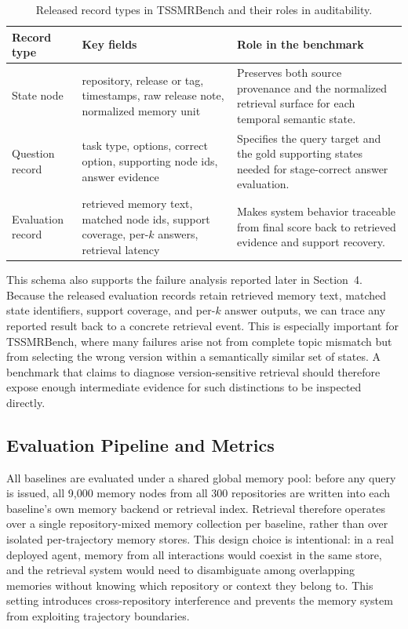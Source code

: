 \begin{table}[t]
\centering
\scriptsize
\caption{Released record types in TSSMRBench and their roles in auditability.}
\label{tab:record-schema}
\setlength{\tabcolsep}{2.5pt}
\begin{tabular}{p{}p{}p{}}
\toprule
Record type & Key fields & Role in the benchmark \\
\midrule
State node & repository, release or tag, timestamps, raw release note, normalized memory unit & Preserves both source provenance and the normalized retrieval surface for each temporal semantic state. \\
Question record & task type, options, correct option, supporting node ids, answer evidence & Specifies the query target and the gold supporting states needed for stage-correct answer evaluation. \\
Evaluation record & retrieved memory text, matched node ids, support coverage, per-$k$ answers, retrieval latency & Makes system behavior traceable from final score back to retrieved evidence and support recovery. \\
\bottomrule
\end{tabular}
\end{table}

This schema also supports the failure analysis reported later in Section~4. Because the released evaluation records retain retrieved memory text, matched state identifiers, support coverage, and per-$k$ answer outputs, we can trace any reported result back to a concrete retrieval event. This is especially important for TSSMRBench, where many failures arise not from complete topic mismatch but from selecting the wrong version within a semantically similar set of states. A benchmark that claims to diagnose version-sensitive retrieval should therefore expose enough intermediate evidence for such distinctions to be inspected directly.

\subsection{Evaluation Pipeline and Metrics}

All baselines are evaluated under a shared global memory pool: before any query is issued, all 9{,}000 memory nodes from all 300 repositories are written into each baseline's own memory backend or retrieval index. Retrieval therefore operates over a single repository-mixed memory collection per baseline, rather than over isolated per-trajectory memory stores. This design choice is intentional: in a real deployed agent, memory from all interactions would coexist in the same store, and the retrieval system would need to disambiguate among overlapping memories without knowing which repository or context they belong to. This setting introduces cross-repository interference and prevents the memory system from exploiting trajectory boundaries.

